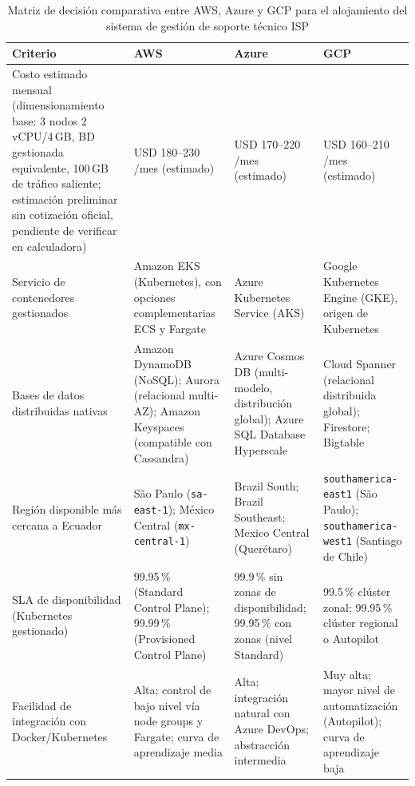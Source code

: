 \documentclass[12pt, a4paper]{article}
\begin{document}
\begin{table}[H]
\centering
\caption{Matriz de decisión comparativa entre AWS, Azure y GCP para el alojamiento del sistema de gestión de soporte técnico ISP}
\label{tab:matriz-decision}
\small
\begin{tabular}{@{}p{4.2cm}p{3.7cm}p{3.7cm}p{3.7cm}@{}}
\toprule
\textbf{Criterio} & \textbf{AWS} & \textbf{Azure} & \textbf{GCP} \\
\midrule
Costo estimado mensual (dimensionamiento base: 3 nodos 2\,vCPU/4\,GB, BD gestionada equivalente, 100\,GB de tráfico saliente; estimación preliminar sin cotización oficial, pendiente de verificar en calculadora) &
USD 180--230 /mes (estimado) &
USD 170--220 /mes (estimado) &
USD 160--210 /mes (estimado) \\
\addlinespace
Servicio de contenedores gestionados &
Amazon EKS (Kubernetes), con opciones complementarias ECS y Fargate &
Azure Kubernetes Service (AKS) &
Google Kubernetes Engine (GKE), origen de Kubernetes \\
\addlinespace
Bases de datos distribuidas nativas &
Amazon DynamoDB (NoSQL); Aurora (relacional multi-AZ); Amazon Keyspaces (compatible con Cassandra) &
Azure Cosmos DB (multi-modelo, distribución global); Azure SQL Database Hyperscale &
Cloud Spanner (relacional distribuida global); Firestore; Bigtable \\
\addlinespace
Región disponible más cercana a Ecuador &
São Paulo (\texttt{sa-east-1}); México Central (\texttt{mx-central-1}) &
Brazil South; Brazil Southeast; Mexico Central (Querétaro) &
\texttt{southamerica-east1} (São Paulo); \texttt{southamerica-west1} (Santiago de Chile) \\
\addlinespace
SLA de disponibilidad (Kubernetes gestionado) &
99.95\,\% (Standard Control Plane); 99.99\,\% (Provisioned Control Plane) \cite{aws_eks_sla} &
99.9\,\% sin zonas de disponibilidad; 99.95\,\% con zonas (nivel Standard) \cite{azure_aks_sla} &
99.5\,\% clúster zonal; 99.95\,\% clúster regional o Autopilot \cite{gcp_gke_sla} \\
\addlinespace
Facilidad de integración con Docker/Kubernetes &
Alta; control de bajo nivel vía node groups y Fargate; curva de aprendizaje media &
Alta; integración natural con Azure DevOps; abstracción intermedia &
Muy alta; mayor nivel de automatización (Autopilot); curva de aprendizaje baja \\
\bottomrule
\end{tabular}
\end{table}
\newpage
\end{document}
